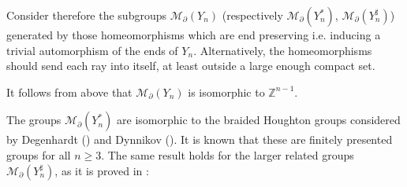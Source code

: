 \documentclass[twoside]{irmaems}
\theoremstyle{plain}
\theoremstyle{definition}
\theoremstyle{remark}
\newcommand{\Z}{{\mathbb{Z}}}
\begin{document}
\vspace{0.2cm}
\noindent
Consider therefore the 
subgroups  ${\mathcal M}_{\partial}(Y_n)$ (respectively ${\mathcal M}_{\partial}(Y_n^*)$, ${\mathcal M}_{\partial}(Y_n^{\sharp})$) generated by  those homeomorphisms 
which are end preserving i.e. inducing a trivial automorphism of 
the ends of $Y_n$.
Alternatively, the homeomorphisms should send each ray into itself, at 
least outside a large enough compact set. 

\vspace{0.2cm}
\noindent 
It follows from above that ${\mathcal M}_{\partial}(Y_n)$ is isomorphic 
to  $\Z^{n-1}$. 



 
\vspace{0.2cm}
\noindent The groups ${\mathcal M}_{\partial}(Y_n^*)$  are  
isomorphic to the braided Houghton groups considered by 
Degenhardt (\cite{Deg}) and Dynnikov (\cite{Dy}). 
It is known that these are finitely presented 
groups for all $n\geq 3$. 
 The same result holds for the larger 
related groups ${\mathcal M}_{\partial}(Y_n^{\sharp})$, as it is proved in 
\cite{fu}:
\end{document}
